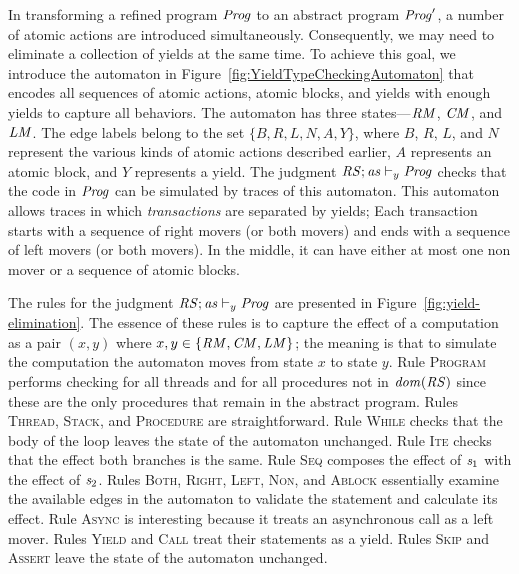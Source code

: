 In transforming a refined program $\mathit{Prog}$ to an abstract program $\mathit{Prog}'$, a number of atomic actions 
are introduced simultaneously.
Consequently, we may need to eliminate a collection of yields at the same time.
To achieve this goal, we introduce the automaton in Figure~\ref{fig:YieldTypeCheckingAutomaton} that encodes 
all sequences of atomic actions, atomic blocks, and yields with enough yields to capture all behaviors.
The automaton has three states---$\mathit{RM}$, $\mathit{CM}$, and $\mathit{LM}$.
The edge labels belong to the set $\{B,R,L,N,A,Y\}$, where $B$, $R$, $L$, and $N$ represent the various kinds 
of atomic actions described earlier, $A$ represents an atomic block, and $Y$ represents a yield.
The judgment $\mathit{RS};\mathit{as} \vdash_y \mathit{Prog}$ checks that the code in $\mathit{Prog}$ can be simulated by traces of this automaton.
This automaton allows traces in which {\em transactions\/} are separated by yields;
Each transaction starts with a sequence of right movers (or both movers) and ends with a sequence of left movers (or both movers).
In the middle, it can have either at most one non mover or a sequence of atomic blocks.

The rules for the judgment $\mathit{RS};\mathit{as} \vdash_y \mathit{Prog}$ are presented in Figure~\ref{fig:yield-elimination}.
The essence of these rules is to capture the effect of a computation as a pair $(x,y)$ where $x,y \in \{\mathit{RM},\mathit{CM},\mathit{LM}\}$;
the meaning is that to simulate the computation the automaton moves from state $x$ to state $y$.
Rule \textsc{Program} performs checking for all threads and for all procedures not in $\mathit{dom}(\mathit{RS})$ since these are the 
only procedures that remain in the abstract program.
Rules \textsc{Thread}, \textsc{Stack}, and \textsc{Procedure} are straightforward.
Rule \textsc{While} checks that the body of the loop leaves the state of the automaton unchanged.
Rule \textsc{Ite} checks that the effect both branches is the same.
Rule \textsc{Seq} composes the effect of $\mathit{s}_1$ with the effect of $\mathit{s}_2$.
Rules \textsc{Both}, \textsc{Right}, \textsc{Left}, \textsc{Non}, and \textsc{Ablock} essentially 
examine the available edges in the automaton to validate the statement and calculate its effect.
Rule \textsc{Async} is interesting because it treats an asynchronous call as a left mover.
Rules \textsc{Yield} and \textsc{Call} treat their statements as a yield.
Rules \textsc{Skip} and \textsc{Assert} leave the state of the automaton unchanged.

